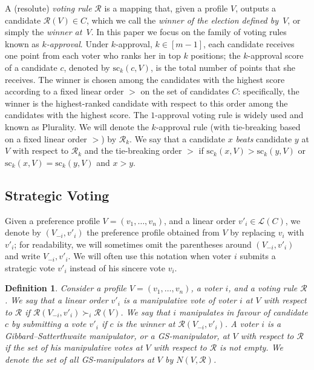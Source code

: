 \documentclass[11pt]{article}
\newtheorem{definition}{Definition}
\newcommand{\calR}{\mathcal{R}}
\newcommand{\calL}{\mathcal{L}}
\newcommand{\scr}{\mathrm{sc}}
\begin{document}

A (resolute) {\em voting rule} $\calR$ is a mapping that, given a profile $V$, outputs a candidate ${\calR(V)\in C}$,
which we call the {\em winner of the election defined by~$V$}, or simply the {\em winner at~$V$}. 
In this paper we focus on
the family of voting rules known as {\em $k$-approval}.
Under $k$-approval, $k\in [m-1]$, each candidate receives one point from each voter who ranks
her in top $k$ positions; the $k$-approval score of a candidate $c$, denoted by $\scr_k(c, V)$,
is the total number of points that she receives.
The winner is chosen among the candidates with the highest score
according to a fixed linear order $>$ on the set of candidates $C$: specifically, the winner
is the highest-ranked candidate with respect to this order among the candidates with the highest score.
The $1$-approval voting rule is widely used and known as Plurality. We will denote the $k$-approval rule
(with tie-breaking based on a fixed linear order $>$) by $\calR_k$.
We say that a candidate $x$ {\em beats} candidate $y$ at $V$ with respect to $\calR_k$ and the tie-breaking order $>$
if $\scr_k(x, V) > \scr_k(y, V)$ or $\scr_k(x, V)=\scr_k(y, V)$ and $x>y$.

\subsection{Strategic Voting}\label{sec:strategic}

Given a preference profile $V=(v_1, \dots, v_n)$, and a linear order $v'_i\in\calL(C)$, we denote by $(V_{-i}, v'_i)$
the preference profile obtained from $V$ by replacing $v_i$ with $v'_i$; for readability,
we will sometimes omit the parentheses around $(V_{-i}, v'_i)$ and write $V_{-i}, v'_i$.
We will often use this notation when voter $i$ submits a strategic vote $v'_i$ instead of his sincere vote $v_i$.


\begin{definition}\label{def:GS}
Consider a profile $V=(v_1, \dots, v_n)$, a voter $i$, and a voting rule $\calR$. 
We say that a linear order $v'_i$ is a {\em manipulative vote} of voter $i$ at $V$
with respect to $\calR$ if $\calR(V_{-i}, v'_i)\succ_i \calR(V)$.
We say that $i$ manipulates {\em in favour of candidate $c$} by submitting a vote $v'_i$ if
$c$ is the winner at $\calR(V_{-i}, v'_i)$. 
A voter $i$ is a {\em Gibbard--Sat\-ter\-thwaite manipulator}, or a {\em GS-manipula\-tor}, 
at $V$ with respect to $\calR$ if the set of his manipulative votes at $V$
with respect to $\calR$ is not empty.
We denote the set of all GS-manipulators at $V$ by $N(V, \calR)$.
\end{definition}
\end{document}
